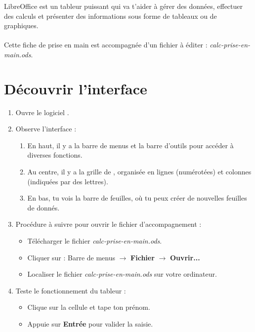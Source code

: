 % 
\emptyBackground
\def\amorce{\textit{calc-prise-en-main.ods}}


LibreOffice \Calc est un tableur puissant qui va t'aider à gérer des données, effectuer des calculs et présenter des informations sous forme de tableaux ou de graphiques.
\\\\
Cette fiche de prise en main est accompagnée d'un fichier \Calc à éditer : \amorce.

\section{Découvrir l'interface}

\begin{enumerate}
    \item Ouvre le logiciel \Calc.
    \item Observe l'interface :
    \begin{enumerate}
    \item En haut, il y a la barre de menus et la barre d'outils pour accéder à diverses fonctions.
    \item Au centre, il y a la grille de \cell, organisée en lignes (numérotées) et colonnes (indiquées par des lettres).
    \item En bas, tu vois la barre de feuilles, où tu peux créer de nouvelles feuilles de donnés.
    \end{enumerate}
    \item Procédure à suivre pour ouvrir le fichier d'accompagnement :
    \begin{itemize}
        \item Télécharger le fichier \amorce.
        \item Cliquer sur :
        Barre de menus $\rightarrow$ \textbf{Fichier} $\rightarrow$  \textbf{Ouvrir...}
        \item Localiser le fichier \amorce{} sur votre ordinateur.
    \end{itemize}
    \item Teste le fonctionnement du tableur :
    \begin{itemize}
    \item Clique sur la cellule \cell[C3] et tape ton prénom.
    \item Appuie sur \textbf{Entrée} pour valider la saisie.
    \end{itemize}
\end{enumerate}

